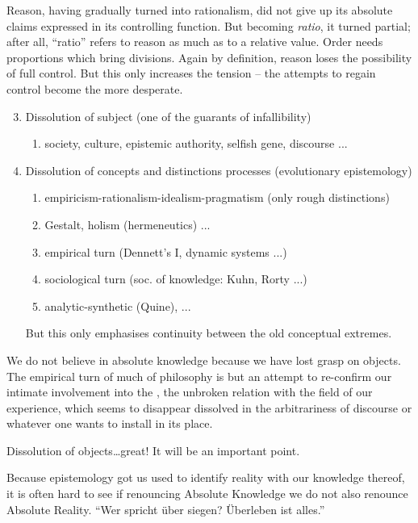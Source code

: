 {Reason, having gradually turned into 
rationalism, did not give up its absolute claims expressed in its
controlling function. But becoming {\em ratio}, it turned partial; 
after 
all, ``ratio'' refers to reason as much as to a relative value. Order needs 
proportions which bring divisions.
 Again by definition, reason loses the possibility of 
full control. But this only increases the tension -- the attempts to 
regain control become the more desperate.  

\begin{enumerate}\setcounter{enumi}{2}
\item Dissolution of subject (one of the guarants of infallibility)
 \begin{enumerate}
  \item society, culture, epistemic authority, selfish gene, discourse ...
 \end{enumerate}
\item Dissolution of concepts and distinctions \impl processes 
 (evolutionary epistemology)
 \begin{enumerate}
  \item empiricism-rationalism-idealism-pragmatism (only rough distinctions)
  \item Gestalt, holism (hermeneutics) ...
  \item empirical turn (Dennett's I, dynamic systems ...)
  \item sociological turn (soc. of knowledge: Kuhn, Rorty ...)
  \item analytic-synthetic (Quine), ...
 \end{enumerate}
But this only emphasises continuity between the old conceptual extremes.
\end{enumerate}

\pa
We do not believe in absolute knowledge because we have lost grasp on 
objects. The empirical turn of much of philosophy is but an attempt 
to re-confirm our intimate involvement into the , 
the unbroken relation with the field of our experience, which seems to 
disappear dissolved in the arbitrariness of discourse or whatever one 
wants to install in its place. 

Dissolution of objects\ldots great! It will be an important point.

\label{pa:attitudes}
Because
epistemology got us used to identify reality with our knowledge thereof, it
is often hard to see if renouncing Absolute Knowledge we do not also renounce 
Absolute Reality. ``Wer spricht \"{u}ber siegen? \"{U}berleben ist alles.''

}
